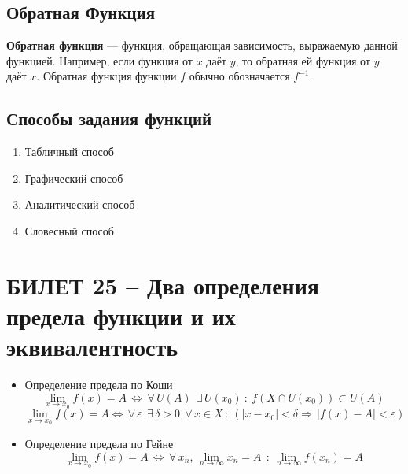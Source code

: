 \documentclass{article}
\begin{document}
\subsection{Обратная Функция}
\textbf{Обратная функция} — функция, обращающая зависимость, выражаемую данной функцией. Например, если функция от $x$ даёт $y$, то обратная ей функция от $y$ даёт $x$. Обратная функция функции $f$ обычно обозначается $f^{-1}$.
\subsection{Способы задания функций}
\begin{enumerate}
    \item Табличный способ
    \item Графический способ
    \item Аналитический способ
    \item Словесный способ
\end{enumerate}
\newpage
\section{БИЛЕТ 25 -- Два определения предела функции и их эквивалентность}
\begin{itemize}
    \item Определение предела по Коши 
    $$ \lim_{x\to x_0} f(x)=A\, \Leftrightarrow\,\forall\, U(A)\:\:\exists \, U(x_0)\: :\: f(X\cap U(x_0))\subset U(A) $$
    $$ \lim_{x\to x_0} f(x)=A\Leftrightarrow \,\forall\,\varepsilon\:\:\exists\,\delta>0\:\:\forall \, x\in X\,:\: (|x-x_0|<\delta \Rightarrow \, |f(x)-A|<\varepsilon)  $$
    \item Определение предела по Гейне
    $$ \lim_{x\to x_0} f(x) =A\,\Leftrightarrow\,\forall\, x_n ,\,\lim_{n\to\infty} x_n=A\:\: :\: \lim_{n\to\infty} f(x_n)=A $$
\end{itemize}
\end{document}
